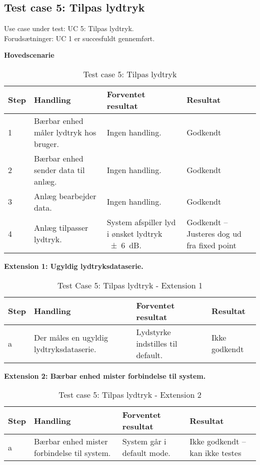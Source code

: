 \newpage
\subsection*{Test case 5: Tilpas lydtryk}
Use case under test: UC 5: Tilpas lydtryk.\\
Forudsætninger:	UC 1 er succesfuldt gennemført.

\textbf{Hovedscenarie}
\begin{table}[H]
	\centering
		\begin{tabular}{|l|p{5 cm}|p{5 cm}|p{3.5 cm}|} 
		\hline
			Step & Handling & Forventet resultat & Resultat\\ \hline
			1 & Bærbar enhed måler lydtryk hos bruger. & Ingen handling. & Godkendt\\ \hline
			2 & Bærbar enhed sender data til anlæg. & Ingen handling. & Godkendt\\ \hline
			3 & Anlæg bearbejder data. & Ingen handling. & Godkendt\\ \hline
			4 & Anlæg tilpasser lydtryk. & System afspiller lyd i ønsket lydtryk \SI{+-6}{dB}. & Godkendt – Justeres dog ud fra fixed point\\ \hline
		\end{tabular}
	\caption{Test case 5: Tilpas lydtryk}
	\label{tab:TC5}
\end{table}

\textbf{Extension 1: Ugyldig lydtryksdataserie.}
\begin{table}[H]
	\centering
		\begin{tabular}{|l|p{5 cm}|p{5 cm}|p{3.5 cm}|} 
		\hline
			Step & Handling & Forventet resultat & Resultat\\ \hline
			a & Der måles en ugyldig lydtryksdataserie. & Lydstyrke indstilles til default. & Ikke godkendt  \\ \hline
		\end{tabular}
	\caption{Test Case 5: Tilpas lydtryk - Extension 1}
	\label{tab:TC5ex1}
\end{table}

\textbf{Extension 2: Bærbar enhed mister forbindelse til system.}
\begin{table}[H]
	\centering
		\begin{tabular}{|l|p{5 cm}|p{5 cm}|p{3.5 cm}|} 
		\hline
			Step & Handling & Forventet resultat & Resultat\\ \hline	
			a & Bærbar enhed mister forbindelse til system. & System går i default mode. & Ikke godkendt – kan ikke testes \\ \hline
		\end{tabular}
	\caption{Test case 5: Tilpas lydtryk - Extension 2}
	\label{tab:TC5ex2}
\end{table}




